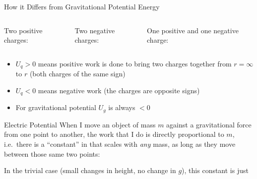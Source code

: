 \documentclass[12pt,aspectratio=169]{beamer}
\newcommand{\eq}[2]{\vspace{#1}{\Large\begin{displaymath}#2\end{displaymath}}}
\begin{document}
\begin{frame}{How it Differs from Gravitational Potential Energy}
  \begin{columns}
    \begin{center}
      Two positive charges:

      \eq{-.3in}{U_q>0}
    \end{center}
    
    \begin{center}
      Two negative charges:

      \eq{-.3in}{U_q>0}
    \end{center}
    
    \begin{center}
      One positive and one negative charge:

      \eq{-.5in}{U_q<0}
    \end{center}
  \end{columns}

  \vspace{.2in}
  \begin{itemize}
  \item $U_q>0$ means positive work is done to bring two charges together from
   $r=\infty$ to $r$ (both charges of the same sign)
  \item $U_q<0$ means negative work (the charges are opposite signs)
  \item For gravitational potential $U_g$ is always $<0$
  \end{itemize}
\end{frame}



\begin{frame}{Electric Potential}
  When I move an object of mass $m$ against a gravitational force from one
  point to another, the work that I do is directly proportional to $m$, i.e.\
  there is a ``constant'' in that scales with \emph{any} mass, as long as they
  move between those same two points:

  \eq{-.2in}{
    W=\Delta U_g=Km
  }

  In the trivial case (small changes in height, no change in $g$), this
  constant is just

  \eq{-.2in}{
    \frac{\Delta U_g}{m}=g\Delta h
  }
\end{frame}
\end{document}
